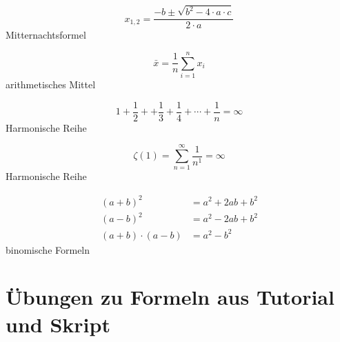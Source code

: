 \documentclass[
12pt,
ngerman
]{scrreprt}
\begin{document}
\begin{equation}
  \label{eq:mnf}
  x_{1,2}=\frac{-b \pm \sqrt{b^2-4 \cdot a \cdot c}}{2 \cdot a}
\end{equation}
Mitternachtsformel

\begin{equation}
  \label{eq:am}
  \bar{x}=\frac{1}{n} \sum_{i=1}^n x_i
\end{equation}
arithmetisches Mittel

\begin{equation}
  \label{eq:hr}
  1+\frac{1}{2}++\frac{1}{3}+\frac{1}{4}+\cdots+\frac{1}{n} = \infty
\end{equation}
Harmonische Reihe

\begin{equation}
  \label{eq:hr2}
  \zeta(1)=\sum_{n=1}^{\infty}\frac{1}{n^1}=\infty
\end{equation}
Harmonische Reihe

\begin{equation*}
  \label{eq:bnf}
  \begin{aligned}
    (a+b)^2         &= a^2+2ab+b^2\\
    (a-b)^2         &= a^2-2ab+b^2\\
    (a+b)\cdot(a-b) &= a^2-b^2
  \end{aligned}
\end{equation*}
binomische Formeln

\chapter[Formelübungen]{Übungen zu Formeln aus Tutorial und Skript}
\label{cha:formelübungen}
\end{document}
